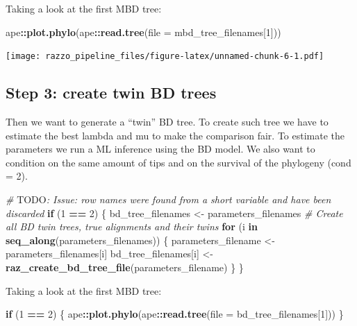 \documentclass[]{article}
\newenvironment{Shaded}{\begin{snugshade}}{\end{snugshade}}
\newcommand{\KeywordTok}[1]{\textcolor[rgb]{0.13,0.29,0.53}{\textbf{#1}}}
\newcommand{\DataTypeTok}[1]{\textcolor[rgb]{0.13,0.29,0.53}{#1}}
\newcommand{\DecValTok}[1]{\textcolor[rgb]{0.00,0.00,0.81}{#1}}
\newcommand{\StringTok}[1]{\textcolor[rgb]{0.31,0.60,0.02}{#1}}
\newcommand{\CommentTok}[1]{\textcolor[rgb]{0.56,0.35,0.01}{\textit{#1}}}
\newcommand{\ControlFlowTok}[1]{\textcolor[rgb]{0.13,0.29,0.53}{\textbf{#1}}}
\newcommand{\OperatorTok}[1]{\textcolor[rgb]{0.81,0.36,0.00}{\textbf{#1}}}
\newcommand{\AlertTok}[1]{\textcolor[rgb]{0.94,0.16,0.16}{#1}}
\newcommand{\NormalTok}[1]{#1}
\begin{document}
Taking a look at the first MBD tree:

\begin{Shaded}
\begin{Highlighting}[]
\NormalTok{ape}\OperatorTok{::}\KeywordTok{plot.phylo}\NormalTok{(ape}\OperatorTok{::}\KeywordTok{read.tree}\NormalTok{(}\DataTypeTok{file =}\NormalTok{ mbd_tree_filenames[}\DecValTok{1}\NormalTok{]))}
\end{Highlighting}
\end{Shaded}

\texttt{[image: razzo\_pipeline\_files/figure-latex/unnamed-chunk-6-1.pdf]}

\subsection{Step 3: create twin BD
trees}\label{step-3-create-twin-bd-trees}

Then we want to generate a ``twin'' BD tree. To create such tree we have
to estimate the best lambda and mu to make the comparison fair. To
estimate the parameters we run a ML inference using the BD model. We
also want to condition on the same amount of tips and on the survival of
the phylogeny (cond = 2).

\begin{Shaded}
\begin{Highlighting}[]
\CommentTok{# }\AlertTok{TODO}\CommentTok{: Issue: row names were found from a short variable and have been discarded}
\ControlFlowTok{if}\NormalTok{ (}\DecValTok{1} \OperatorTok{==}\StringTok{ }\DecValTok{2}\NormalTok{) \{}
\NormalTok{  bd_tree_filenames <-}\StringTok{ }\NormalTok{parameters_filenames}
  \CommentTok{# Create all BD twin trees, true alignments and their twins}
  \ControlFlowTok{for}\NormalTok{ (i }\ControlFlowTok{in} \KeywordTok{seq_along}\NormalTok{(parameters_filenames)) \{}
\NormalTok{    parameters_filename <-}\StringTok{ }\NormalTok{parameters_filenames[i]}
\NormalTok{    bd_tree_filenames[i] <-}\StringTok{ }\KeywordTok{raz_create_bd_tree_file}\NormalTok{(parameters_filename)}
\NormalTok{  \}}
\NormalTok{\}}
\end{Highlighting}
\end{Shaded}

Taking a look at the first MBD tree:

\begin{Shaded}
\begin{Highlighting}[]
\ControlFlowTok{if}\NormalTok{ (}\DecValTok{1} \OperatorTok{==}\StringTok{ }\DecValTok{2}\NormalTok{) \{}
\NormalTok{  ape}\OperatorTok{::}\KeywordTok{plot.phylo}\NormalTok{(ape}\OperatorTok{::}\KeywordTok{read.tree}\NormalTok{(}\DataTypeTok{file =}\NormalTok{ bd_tree_filenames[}\DecValTok{1}\NormalTok{]))}
\NormalTok{\}}
\end{Highlighting}
\end{Shaded}
\end{document}
